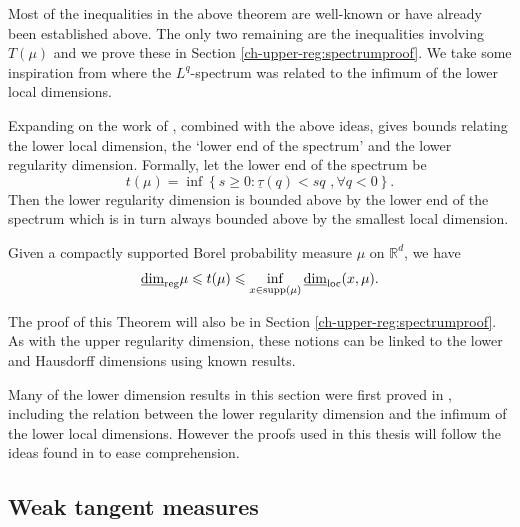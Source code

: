Most of the inequalities in the above theorem are well-known or have already been established above.  The only two remaining are the inequalities involving $T(\mu)$ and we prove these in Section \ref{ch-upper-reg:spectrumproof}. We take some inspiration from \cite{fraser-jordan} where the $L^q$-spectrum was related to the infimum of the lower local dimensions.


Expanding on the work of \cite{fraser-jordan}, combined with the above ideas, gives bounds relating the lower local dimension, the `lower end of the spectrum' and the lower regularity dimension. Formally, let the lower end of the spectrum be
\[
t(\mu) = \inf\left\{ s \ge 0 \colon \underline{\tau}(q) < sq  \, \,, \forall q<0 \right\}.
\]
Then the lower regularity dimension is bounded above by the lower end of the spectrum which is in turn always bounded above by the smallest local dimension.

\begin{theorem} \label{ch-upper-reg:lower-relationships}
	Given a compactly supported Borel probability measure $\mu$ on $\mathbb{R}^d$, we have
	\[
    \underline{\dim}_{\textup{reg}} \mu  \leqslant  t(\mu)  \leqslant  \inf_ {x\in \mathrm{supp}(\mu)}  \underline{\dim}_{\mathrm{loc}}(x,\mu).
    \]
\end{theorem}
The proof of this Theorem will also be in Section \ref{ch-upper-reg:spectrumproof}. As with the upper regularity dimension, these notions can be linked to the lower and Hausdorff dimensions using known results. 

Many of the lower dimension results in this section were first proved in \cite{hare_troscheit}, including the relation between the lower regularity dimension and the infimum of the lower local dimensions. However the proofs used in this thesis will follow the ideas found in \cite{fraser-howroyd2} to ease comprehension.




\subsection{Weak tangent measures}\label{ch-upper-reg:sec:tangent}


